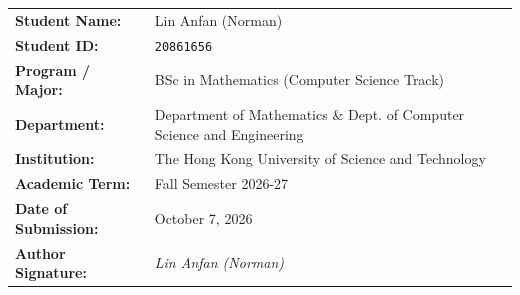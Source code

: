 \documentclass[11pt,a4paper]{article}
\begin{document}
\vspace{0.8cm}
\noindent\begin{tabular}{@{}ll@{}}
\textbf{Student Name:} & Lin Anfan (Norman) \\
\textbf{Student ID:} & \texttt{20861656} \\
\textbf{Program / Major:} & BSc in Mathematics (Computer Science Track) \\
\textbf{Department:} & Department of Mathematics \& Dept. of Computer Science and Engineering \\
\textbf{Institution:} & The Hong Kong University of Science and Technology \\
\textbf{Academic Term:} & Fall Semester 2026-27 \\
\textbf{Date of Submission:} & October 7, 2026 \\
\textbf{Author Signature:} & \textit{Lin Anfan (Norman)} \\
\end{tabular}
\end{document}
